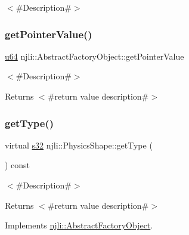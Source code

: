 $<$\#\+Description\#$>$ \mbox{\label{classnjli_1_1_physics_shape_a4ffddf141a426a5a07d0ac19f1913811}} 
\subsubsection{\texorpdfstring{get\+Pointer\+Value()}{getPointerValue()}}
{\footnotesize\ttfamily \mbox{\hyperlink{_util_8h_ad758b7a5c3f18ed79d2fcd23d9f16357}{u64}} njli\+::\+Abstract\+Factory\+Object\+::get\+Pointer\+Value}

$<$\#\+Description\#$>$

\begin{DoxyReturn}{Returns}
$<$\#return value description\#$>$ 
\end{DoxyReturn}
\mbox{\label{classnjli_1_1_physics_shape_ac7c6b2ac373892095f8220d56f8ad6de}} 
\subsubsection{\texorpdfstring{get\+Type()}{getType()}}
{\footnotesize\ttfamily virtual \mbox{\hyperlink{_util_8h_aa62c75d314a0d1f37f79c4b73b2292e2}{s32}} njli\+::\+Physics\+Shape\+::get\+Type (\begin{DoxyParamCaption}{ }\end{DoxyParamCaption}) const\hspace{0.3cm}{\ttfamily [pure virtual]}}

$<$\#\+Description\#$>$

\begin{DoxyReturn}{Returns}
$<$\#return value description\#$>$ 
\end{DoxyReturn}


Implements \mbox{\hyperlink{classnjli_1_1_abstract_factory_object_a207c86146d40d0794708ae7f2d4e60a7}{njli\+::\+Abstract\+Factory\+Object}}.



